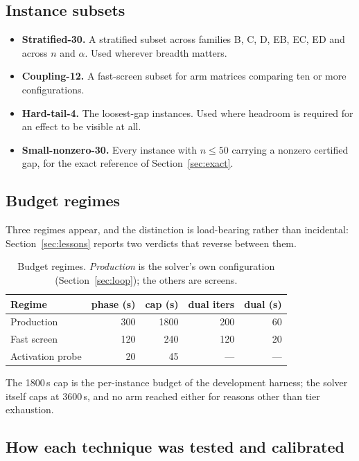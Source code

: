 \documentclass[11pt,a4paper]{article}
\begin{document}
\subsection{Instance subsets}

\begin{itemize}
  \item \textbf{Stratified-30.} A stratified subset across families B, C, D, EB,
    EC, ED and across $n$ and $\alpha$. Used wherever breadth matters.
  \item \textbf{Coupling-12.} A fast-screen subset for arm matrices comparing ten
    or more configurations.
  \item \textbf{Hard-tail-4.} The loosest-gap instances. Used where headroom is
    required for an effect to be visible at all.
  \item \textbf{Small-nonzero-30.} Every instance with $n\le 50$ carrying a
    nonzero certified gap, for the exact reference of Section~\ref{sec:exact}.
\end{itemize}

\subsection{Budget regimes}

Three regimes appear, and the distinction is load-bearing rather than incidental:
Section~\ref{sec:lessons} reports two verdicts that reverse between them.

\begin{table}[htbp]
\centering
\caption{Budget regimes. \emph{Production} is the solver's own configuration
(Section~\ref{sec:loop}); the others are screens.}
\label{tab:budgets}
\begin{tabular}{lrrrr}
\toprule
Regime & phase (s) & cap (s) & dual iters & dual (s) \\
\midrule
Production & 300 & 1800 & 200 & 60 \\
Fast screen & 120 & 240 & 120 & 20 \\
Activation probe & 20 & 45 & --- & --- \\
\bottomrule
\end{tabular}
\end{table}

The 1800\,s cap is the per-instance budget of the development harness; the solver
itself caps at 3600\,s, and no arm reached either for reasons other than tier
exhaustion.

\subsection{How each technique was tested and calibrated}
\end{document}
